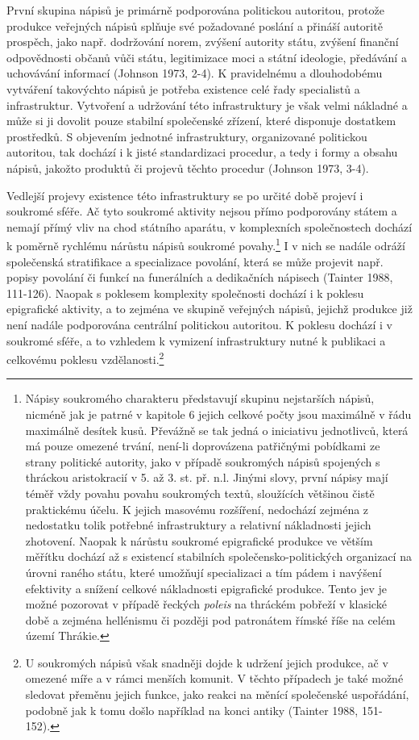 První skupina nápisů je primárně podporována politickou autoritou, protože produkce veřejných nápisů splňuje své požadované poslání a přináší autoritě prospěch, jako např. dodržování norem, zvýšení autority státu, zvýšení finanční odpovědnosti občanů vůči státu, legitimizace moci a státní ideologie, předávání a uchovávání informací (Johnson 1973, 2-4). K pravidelnému a dlouhodobému vytváření takovýchto nápisů je potřeba existence celé řady specialistů a infrastruktur. Vytvoření a udržování této infrastruktury je však velmi nákladné a může si ji dovolit pouze stabilní společenské zřízení, které disponuje dostatkem prostředků. S objevením jednotné infrastruktury, organizované politickou autoritou, tak dochází i k jisté standardizaci procedur, a tedy i formy a obsahu nápisů, jakožto produktů či projevů těchto procedur (Johnson 1973, 3-4).

Vedlejší projevy existence této infrastruktury se po určité době projeví i soukromé sféře. Ač tyto soukromé aktivity nejsou přímo podporovány státem a nemají přímý vliv na chod státního aparátu, v komplexních společnostech dochází k poměrně rychlému nárůstu nápisů soukromé povahy.\footnote{Nápisy soukromého charakteru představují skupinu nejstarších nápisů, nicméně jak je patrné v kapitole 6 jejich celkové počty jsou maximálně v řádu maximálně desítek kusů. Převážně se tak jedná o iniciativu jednotlivců, která má pouze omezené trvání, není-li doprovázena patřičnými pobídkami ze strany politické autority, jako v případě soukromých nápisů spojených s thráckou aristokracií v 5. až 3. st. př. n.l. Jinými slovy, první nápisy mají téměř vždy povahu povahu soukromých textů, sloužících většinou čistě praktickému účelu. K jejich masovému rozšíření, nedochází zejména z nedostatku tolik potřebné infrastruktury a relativní nákladnosti jejich zhotovení. Naopak k nárůstu soukromé epigrafické produkce ve větším měřítku dochází až s existencí stabilních společensko-politických organizací na úrovni raného státu, které umožňují specializaci a tím pádem i navýšení efektivity a snížení celkové nákladnosti epigrafické produkce. Tento jev je možné pozorovat v případě řeckých {\em poleis} na thráckém pobřeží v klasické době a zejména hellénismu či později pod patronátem římské říše na celém území Thrákie.} I v nich se nadále odráží společenská stratifikace a specializace povolání, která se může projevit např. popisy povolání či funkcí na funerálních a dedikačních nápisech (Tainter 1988, 111-126). Naopak s poklesem komplexity společnosti dochází i k poklesu epigrafické aktivity, a to zejména ve skupině veřejných nápisů, jejichž produkce již není nadále podporována centrální politickou autoritou. K poklesu dochází i v soukromé sféře, a to vzhledem k vymizení infrastruktury nutné k publikaci a celkovému poklesu vzdělanosti.\footnote{U soukromých nápisů však snadněji dojde k udržení jejich produkce, ač v omezené míře a v rámci menších komunit. V těchto případech je také možné sledovat přeměnu jejich funkce, jako reakci na měnící společenské uspořádání, podobně jak k tomu došlo například na konci antiky (Tainter 1988, 151-152).}

